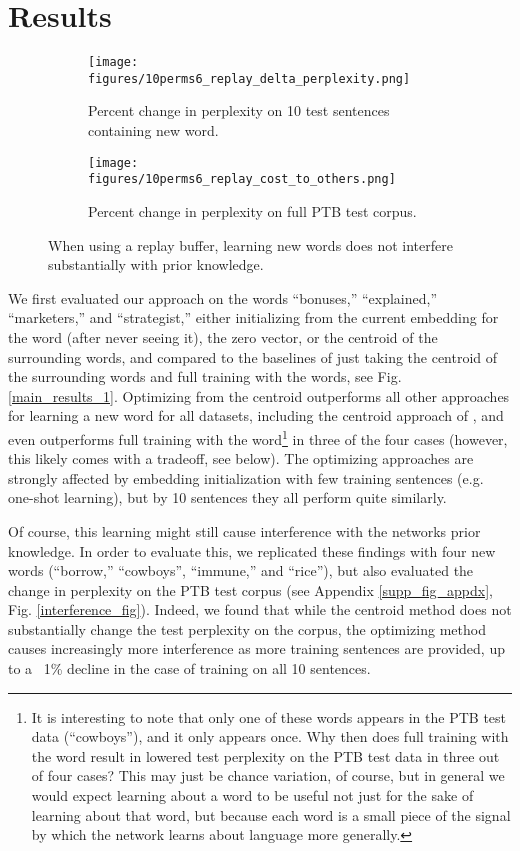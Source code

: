\documentclass{article}
\begin{document}
\section{Results}
\begin{figure}
\centering
\begin{subfigure}[b]{\textwidth}
\texttt{[image: figures/10perms6\_replay\_delta\_perplexity.png]}
\caption{Percent change in perplexity on 10 test sentences containing new word.}
\end{subfigure}
\begin{subfigure}[b]{\textwidth}
\texttt{[image: figures/10perms6\_replay\_cost\_to\_others.png]}
\caption{Percent change in perplexity on full PTB test corpus.}
\end{subfigure}
\caption{When using a replay buffer, learning new words does not interfere substantially with prior knowledge.}
\label{ameliorating_interference_fig}
\end{figure}
We first evaluated our approach on the words ``bonuses,'' ``explained,'' ``marketers,'' and ``strategist,'' either initializing from the current embedding for the word (after never seeing it), the zero vector, or the centroid of the surrounding words, and compared to the baselines of just taking the centroid of the surrounding words and full training with the words, see Fig. \ref{main_results_1}. Optimizing from the centroid outperforms all other approaches for learning a new word for all datasets, including the centroid approach of \citet{Lazaridou2017}, and even outperforms full training with the word\footnote{It is interesting to note that only one of these words appears in the PTB test data (``cowboys''), and it only appears once. Why then does full training with the word result in lowered test perplexity on the PTB test data in three out of four cases? This may just be chance variation, of course, but in general we would expect learning about a word to be useful not just for the sake of learning about that word, but because each word is a small piece of the signal by which the network learns about language more generally.} in three of the four cases (however, this likely comes with a tradeoff, see below). The optimizing approaches are strongly affected by embedding initialization with few training sentences (e.g. one-shot learning), but by 10 sentences they all perform quite similarly. \par
Of course, this learning might still cause interference with the networks prior knowledge. In order to evaluate this, we replicated these findings with four new words (``borrow,'' ``cowboys'', ``immune,'' and ``rice''), but also evaluated the change in perplexity on the PTB test corpus (see Appendix \ref{supp_fig_appdx}, Fig. \ref{interference_fig}). Indeed, we found that while the centroid method does not substantially change the test perplexity on the corpus, the optimizing method causes increasingly more interference as more training sentences are provided, up to a ~1\% decline in the case of training on all 10 sentences. \par
\end{document}
